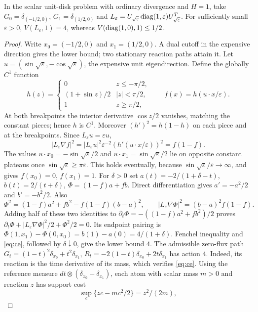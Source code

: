 \begin{proposition}\label{prop:transportrotation}
In the scalar unit-disk problem with ordinary divergence and $H=1$, take
$G_0=\delta_{(-1/2,0)}$, $G_1=\delta_{(1/2,0)}$ and
$L_\varepsilon=U_{\sqrt\varepsilon}\operatorname{diag}(1,\varepsilon)U_{\sqrt\varepsilon}^T$.
For sufficiently small $\varepsilon>0$, $V(L_\varepsilon,1)=4$, whereas
$V(\operatorname{diag}(1,0),1)\le1/2$.
\end{proposition}
\begin{proof}
Write $x_0=(-1/2,0)$ and $x_1=(1/2,0)$. A dual cutoff in the expensive
direction gives the lower bound; two stationary reaction paths attain it.
Let $u=(\sin\sqrt\varepsilon,-\cos\sqrt\varepsilon)$, the expensive unit
eigendirection. Define the globally $C^1$ function
\[
 h(z)=\begin{cases}0&z\le-\pi/2,\\(1+\sin z)/2&|z|<\pi/2,\\1&z\ge\pi/2,
 \end{cases}\qquad f(x)=h(u\cdot x/\varepsilon).
\]
At both breakpoints the interior derivative $\cos z/2$ vanishes, matching
the constant pieces; hence $h$ is $C^1$. Moreover $(h')^2=h(1-h)$ on each
piece and at the breakpoints. Since $L_\varepsilon u=\varepsilon u$,
\[
 |L_\varepsilon\nabla f|^2
 =|L_\varepsilon u|^2\varepsilon^{-2}(h'(u\cdot x/\varepsilon))^2
 =f(1-f).
\]
The values $u\cdot x_0=-\sin\sqrt\varepsilon/2$ and
$u\cdot x_1=\sin\sqrt\varepsilon/2$ lie on opposite constant plateaus
once $\sin\sqrt\varepsilon\ge\pi\varepsilon$. This holds eventually,
because $\sin\sqrt\varepsilon/\varepsilon\to\infty$, and gives
$f(x_0)=0$, $f(x_1)=1$.
For $\delta>0$ set $a(t)=-2/(1+\delta-t)$, $b(t)=2/(t+\delta)$,
$\Phi=(1-f)a+fb$. Direct differentiation gives $a'=-a^2/2$ and
$b'=-b^2/2$. Also
\[
 \Phi^2=(1-f)a^2+fb^2-f(1-f)(b-a)^2,\qquad
 |L_\varepsilon\nabla\Phi|^2=(b-a)^2f(1-f).
\]
Adding half of these two identities to
$\partial_t\Phi=-((1-f)a^2+fb^2)/2$ proves
$\partial_t\Phi+|L_\varepsilon\nabla\Phi|^2/2+\Phi^2/2=0$.
Its endpoint pairing is $\Phi(1,x_1)-\Phi(0,x_0)=b(1)-a(0)=4/(1+\delta)$. Fenchel inequality and
\eqref{eq:ce}, followed by $\delta\downarrow0$, give the lower bound $4$.
The admissible zero-flux path
$G_t=(1-t)^2\delta_{x_0}+t^2\delta_{x_1}$,
$R_t=-2(1-t)\delta_{x_0}+2t\delta_{x_1}$ has action $4$.
Indeed, its reaction is the time derivative of its mass, which verifies
\eqref{eq:ce}. Using the reference measure
$dt\otimes(\delta_{x_0}+\delta_{x_1})$, each atom with scalar mass $m>0$
and reaction $z$ has support cost
\[
 \sup_c\{zc-mc^2/2\}=z^2/(2m),
\]
\end{proof}
